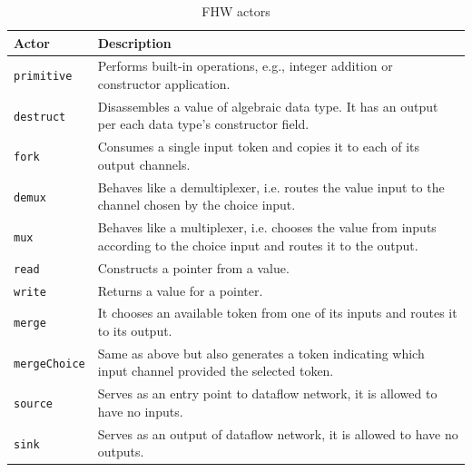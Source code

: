 \begin{table}[t]
\footnotesize
\centering
\begin{tabular}{ |l|l|} 
\hline
\rowcolor{LightBlue}
{Actor} & {Description}\\
\hline
\multirow{2}{0.2\linewidth}{\texttt{primitive}} & \multirow{2}{0.5\linewidth}{Performs built-in operations, e.g., integer addition or constructor application.}\\
{} & {}\\
\hline
\multirow{2}{0.15\linewidth}{\texttt{destruct}} & \multirow{2}{0.5\linewidth}{Disassembles a value of algebraic data type. It has an output per each data type's constructor field.}\\
{} & {} \\
\hline
\multirow{2}{0.15\linewidth}{\texttt{fork}} & \multirow{2}{0.5\linewidth}{Consumes a single input token and copies it to each of its
output channels.}\\
{} & {} \\
\hline
\multirow{2}{0.15\linewidth}{\texttt{demux}} & \multirow{2}{0.5\linewidth}{Behaves like a demultiplexer, i.e. routes the value input to the channel chosen by the choice input.}\\
{} & {}\\
\hline
\multirow{3}{0.15\linewidth}{\texttt{mux}} & \multirow{3}{0.5\linewidth}{Behaves like a multiplexer, i.e. chooses the value from inputs according to the choice input and routes it to the output.} \\
{} & {}\\
{} & {}\\
\hline
\multirow{2}{0.15\linewidth}{\texttt{read}} & \multirow{2}{0.5\linewidth}{Constructs a pointer from a value.} \\
{} & {}\\
\hline
\multirow{2}{0.15\linewidth}{\texttt{write}} & \multirow{2}{0.5\linewidth}{Returns a value for a pointer.} \\
{} & {}\\
\hline
\multirow{2}{0.15\linewidth}{\texttt{merge}} & \multirow{2}{0.5\linewidth}{It chooses an available token from one of its inputs and routes it to its output.} \\
{} & {}\\
\hline
\multirow{2}{0.15\linewidth}{\texttt{mergeChoice}} & \multirow{2}{0.5\linewidth}{Same as above but also generates a token
indicating which input channel provided the selected token.}\\
{} & {}\\
\hline
\multirow{2}{0.15\linewidth}{\texttt{source}} & \multirow{2}{0.5\linewidth}{Serves as an entry point to dataflow network, it is allowed to have no inputs.}\\
{} & {}\\
\hline
\multirow{2}{0.15\linewidth}{\texttt{sink}} & \multirow{2}{0.5\linewidth}{Serves as an output of dataflow network, it is allowed to have no outputs.}\\
{} & {}\\
\hline
\end{tabular}
    \caption{FHW actors}
    \label{tab:actors}
\end{table}


